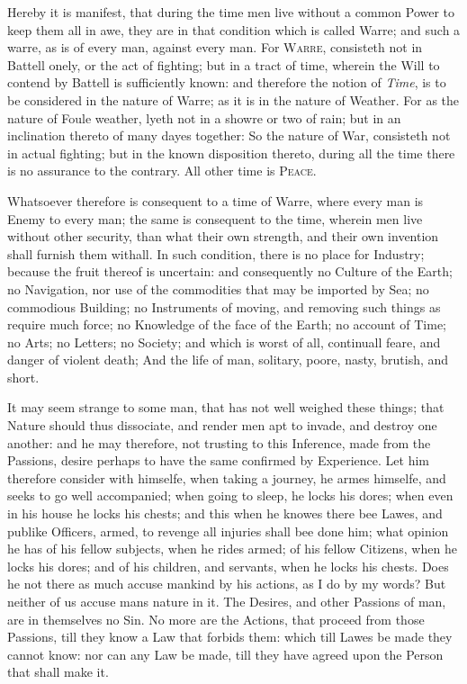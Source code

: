 Hereby it is manifest, that during the time men live without a common
Power to keep them all in awe, they are in that condition which is
called Warre; and such a warre, as is of every man, against every man.
For \textsc{Warre}, consisteth not in Battell onely, or the act of
fighting; but in a tract of time, wherein the Will to contend by
Battell is sufficiently known: and therefore the  notion of
\textit{Time}, is to be considered in the nature of Warre; as it is in
the nature of Weather. For as the nature of Foule weather, lyeth not
in a showre or two of rain; but in an inclination thereto of many
dayes together: So the nature of War, consisteth not in actual
fighting; but in the known disposition thereto, during all the time
there is no assurance to the contrary. All other time is
\textsc{Peace}.

Whatsoever therefore is consequent to a time of Warre, where every man
is Enemy to every man; the same is consequent to the time, wherein men
live without other security, than what their own strength, and their
own invention shall furnish them withall. In such condition, there is
no place for Industry; because the fruit thereof is uncertain: and
consequently no Culture of the Earth; no Navigation, nor use of the
commodities that may be imported by Sea; no commodious Building; no
Instruments of moving, and removing such things as require much force;
no Knowledge of the face of the Earth; no account of Time; no Arts; no
Letters; no Society; and which is worst of all, continuall feare, and
danger of violent death; And the life of man, solitary, poore, nasty,
brutish, and short.

It may seem strange to some man, that has not well weighed these
things; that Nature should thus dissociate, and render men apt to
invade, and destroy one another: and he may therefore, not trusting to
this Inference, made from the Passions, desire perhaps to have the
same confirmed by Experience. Let him therefore consider with
himselfe, when taking a journey, he armes himselfe, and seeks to go
well accompanied; when going to sleep, he locks his dores; when even
in his house he locks his chests; and this when he knowes there bee
Lawes, and publike Officers, armed, to revenge all injuries shall bee
done him; what opinion he has of his fellow subjects, when he rides
armed; of his fellow Citizens, when he locks his dores; and of his
children, and servants, when he locks his chests. Does he not there as
much accuse mankind by his actions, as I do by my words? But neither
of us accuse mans nature in it. The Desires, and other Passions of
man, are in themselves no Sin. No more are the Actions, that proceed
from those Passions, till they know a Law that forbids them: which
till Lawes be made they cannot know: nor can any  Law be
made, till they have agreed upon the Person that shall make it.

